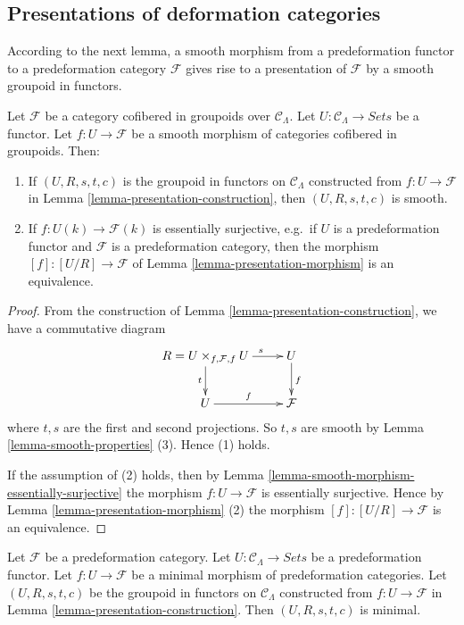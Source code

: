 \subsection{Presentations of deformation categories}
\label{subsection-presentation-deformation-categories}

\noindent
According to the next lemma, a smooth morphism from a predeformation functor to 
a predeformation category $\mathcal{F}$ gives rise to a presentation of 
$\mathcal{F}$ by a smooth groupoid in functors.

\begin{lemma}
\label{lemma-smooth-groupoid-in-functors-construction}
Let $\mathcal{F}$ be a category cofibered in groupoids over $\mathcal 
C_\Lambda$.  Let $U: \mathcal{C}_\Lambda \to \textit{Sets}$ be 
a functor.  Let $f: U \to \mathcal{F}$ be a smooth morphism of 
categories cofibered in groupoids. Then:
\begin{enumerate}
\item If $(U,R,s,t,c)$ is the groupoid in functors on $\mathcal{C}_\Lambda$ 
constructed from $f: U \to \mathcal{F}$ in Lemma 
\ref{lemma-presentation-construction}, then $(U,R,s,t,c)$ is smooth. 
\item If $f: U(k) \to \mathcal{F}(k)$ is essentially surjective, e.g.\ 
if $U$ is a predeformation functor and $\mathcal{F}$ is a predeformation 
category, then the morphism $[f]: [U/R] \to \mathcal{F}$ of Lemma 
\ref{lemma-presentation-morphism} is an equivalence.
\end{enumerate}
\end{lemma}

\begin{proof}
From the construction of Lemma \ref{lemma-presentation-construction}, we have a 
commutative diagram
\[
\xymatrix{
R = U \times_{f,\mathcal{F}, f} U \ar[r]^{\hspace{7mm} s} \ar[d]_{t} & U 
\ar[d]^{f} \\
U \ar[r]^{f} & \mathcal{F}
}
\]
where $t,s$ are the first and second projections.  So $t,s$ are smooth by Lemma 
\ref{lemma-smooth-properties} (3).  Hence (1) holds.

\medskip \noindent
If the assumption of (2) holds, then by Lemma 
\ref{lemma-smooth-morphism-essentially-surjective} the morphism $f: U 
\to \mathcal{F}$ is essentially surjective. Hence by Lemma 
\ref{lemma-presentation-morphism} (2) the morphism $[f]: [U/R] \to 
\mathcal{F}$ is an equivalence.
\end{proof}

\begin{lemma}
\label{lemma-minimal-groupoid-in-functors-construction}
Let $\mathcal{F}$ be a predeformation category.  Let $U: \mathcal{C}_\Lambda 
\to \textit{Sets}$ be a predeformation functor.  Let $f: U 
\to \mathcal{F}$ be a minimal morphism of predeformation categories. Let 
$(U,R,s,t,c)$ be the groupoid in functors on $\mathcal{C}_\Lambda$ constructed 
from $f: U \to \mathcal{F}$ in Lemma 
\ref{lemma-presentation-construction}.  Then $(U,R,s,t,c)$ is minimal. 
\end{lemma}

